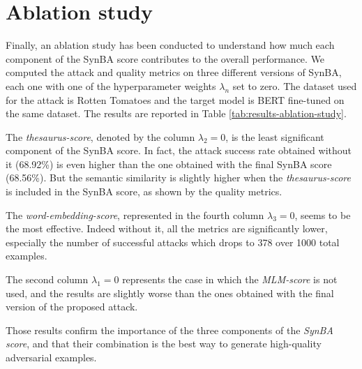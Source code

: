 \section{Ablation study}\label{sec:ablation-study}

Finally, an ablation study has been conducted to understand how much each component of the SynBA score contributes to the overall performance. 
We computed the attack and quality metrics on three different versions of SynBA, each one with one of the hyperparameter weights $\lambda_n$ set to zero.
The dataset used for the attack is Rotten Tomatoes and the target model is BERT fine-tuned on the same dataset.
The results are reported in Table \ref{tab:results-ablation-study}.

The \emph{thesaurus-score}, denoted by the column $\lambda_2=0$, is the least significant component of the SynBA score. In fact, the attack success rate obtained without it (68.92\%) is even higher than the one obtained with the final SynBA score (68.56\%).
But the semantic similarity is slightly higher when the \emph{thesaurus-score} is included in the SynBA score, as shown by the quality metrics.

The \emph{word-embedding-score}, represented in the fourth column $\lambda_3=0$, seems to be the most effective. Indeed without it, all the metrics are significantly lower, especially the number of successful attacks which drops to 378 over 1000 total examples.

The second column $\lambda_1=0$ represents the case in which the \emph{MLM-score} is not used, and the results are slightly worse than the ones obtained with the final version of the proposed attack.

Those results confirm the importance of the three components of the \emph{SynBA score}, and that their combination is the best way to generate high-quality adversarial examples.

